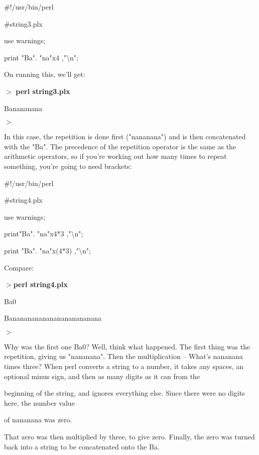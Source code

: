 \documentclass[a4paper,11pt]{book}
\begin{document}
\noindent \#!/usr/bin/perl

\noindent \#string3.plx

\noindent use warnings;

\noindent print "Ba". "na"x4 ,"\textbackslash n";

\noindent 

\noindent On running this, we'll get:

\noindent 

\noindent $>$ \textbf{perl string3.plx}

\noindent Banananana

\noindent $>$

\noindent 

\noindent In this case, the repetition is done first ("nananana") and is then concatenated with the "Ba". The precedence of the repetition operator is the same as the arithmetic operators, so if you're working out how many times to repeat something, you're going to need brackets:

\noindent 

\noindent \#!/usr/bin/perl

\noindent \#string4.plx

\noindent use warnings;

\noindent print"Ba". "na"x4*3 ,"\textbackslash n";

\noindent print "Ba". "na"x(4*3) ,"\textbackslash n";

\noindent 

\noindent Compare:

\noindent 

\noindent $>$\textbf{perl string4.plx}

\noindent Ba0

\noindent Banananananananananananana

\noindent $>$

\noindent 

\noindent Why was the first one Ba0? Well, think what happened. The first thing was the repetition, giving us "nananana". Then the multiplication -- What's nananana times three? When perl converts a string to a number, it takes any spaces, an optional minus sign, and then as many digits as it can from the

\noindent beginning of the string, and ignores everything else. Since there were no digits here, the number value

\noindent of nananana was zero.

\noindent 

\noindent That zero was then multiplied by three, to give zero. Finally, the zero was turned back into a string to be concatenated onto the Ba.
\end{document}
